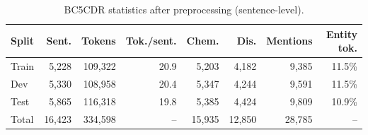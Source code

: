 \begin{table}[t]
\centering
\small
\caption{BC5CDR statistics after preprocessing (sentence-level).}
\label{tab:data}
\begin{tabular}{lrrrrrrr}
\toprule
Split & Sent. & Tokens & Tok./sent. & Chem. & Dis. & Mentions & Entity tok. \\
\midrule
Train & 5,228 & 109,322 & 20.9 & 5,203 & 4,182 & 9,385 & 11.5\% \\
Dev & 5,330 & 108,958 & 20.4 & 5,347 & 4,244 & 9,591 & 11.5\% \\
Test & 5,865 & 116,318 & 19.8 & 5,385 & 4,424 & 9,809 & 10.9\% \\
\midrule
Total & 16,423 & 334,598 & -- & 15,935 & 12,850 & 28,785 & -- \\
\bottomrule
\end{tabular}
\end{table}
